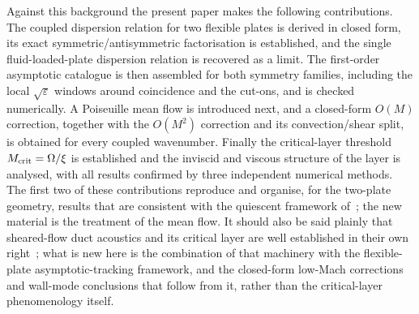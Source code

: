 \documentclass[11pt]{article}
\newcommand{\Om}{\Omega}
\newcommand{\eps}{\varepsilon}
\begin{document}
Against this background the present paper makes the following contributions. The coupled dispersion
relation for two flexible plates is derived in closed form, its exact symmetric/antisymmetric
factorisation is established, and the single fluid-loaded-plate dispersion relation is recovered as a
limit. The first-order
asymptotic catalogue is then assembled for both symmetry families, including the local $\sqrt{\eps}$
windows around coincidence and the cut-ons, and is checked numerically. A Poiseuille mean flow is
introduced next, and a closed-form $O(M)$ correction, together with the $O(M^2)$ correction and its
convection/shear split, is obtained for every coupled wavenumber. Finally the critical-layer threshold
$M_{\rm crit}=\Om/\xi$ is established and the inviscid and viscous structure of the layer is analysed,
with all results confirmed by three independent numerical methods. The first two of these contributions
reproduce and organise, for the two-plate geometry, results that are consistent with the quiescent
framework of~\cite{sarkarsonti,kunte2011,prakash2016}; the new material is the treatment of the mean
flow. It should also be said plainly that sheared-flow duct acoustics and its critical layer are well
established in their own right~\cite{pridmorebrown,brambleydarau,maslowe}; what is new here is the
combination of that machinery with the flexible-plate asymptotic-tracking framework, and the closed-form
low-Mach corrections and wall-mode conclusions that follow from it, rather than the critical-layer
phenomenology itself.
\end{document}
